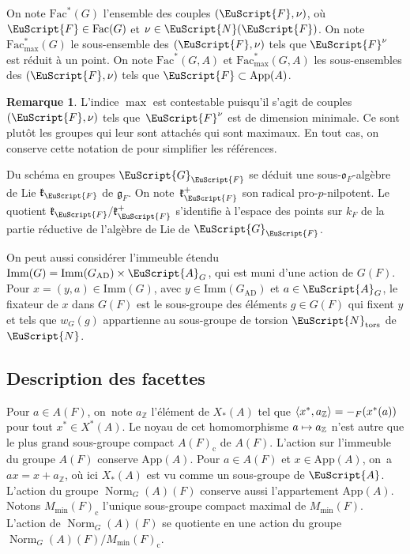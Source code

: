 \documentclass[JEP,XML,SOM,Unicode,francais]{cedram}
\let\mathcal \EuScript
\newcommand{\NoChangel}[1]{%
\expandafter\let\csname old\string#1\endcsname=#1
\let#1=\relax
\newcommand{#1}{\mathcode`l="716C\csname old\string#1\endcsname\mathcode`l="7160 }%
}
\let\<\langle
\let\>\rangle
\newcommand\mto{\mathchoice{\longmapsto}{\mapsto}{\mapsto}{\mapsto}}
\newcommand{\frg}{\mathfrak{g}}
\newcommand{\frk}{\mathfrak{k}}
\newcommand{\fro}{\mathfrak{o}}
\newcommand{\AD}{\mathrm{AD}}
\newcommand{\App}{\mathrm{App}}
\newcommand{\rc}{\mathrm{c}}
\newcommand{\Fac}{\mathrm{Fac}}
\newcommand{\Imm}{\mathrm{Imm}}
\newcommand{\tors}{\mathrm{tors}}
\DeclareMathOperator{\Norm}{Norm}
\DeclareMathOperator{\val}{val} \NoChangel{\val}
\newcommand{\cA}{\mathcal{A}}
\newcommand{\cF}{\mathcal{F}}
\newcommand{\cG}{\mathcal{G}}
\newcommand{\cN}{\mathcal{N}}
\newcommand{\ZZ}{\mathbb{Z}}
\theoremstyle{plain}
\theoremstyle{definition}
\newtheorem*{rem*}{Remarque}
\begin{document}
On note $\Fac^*(G)$ l'ensemble des couples $(\cF,\nu)$, où $\cF\in \Fac(G)$ et $\nu\in \cN(\cF)$. On note $\Fac^*_{\max}(G)$ le sous-ensemble des $(\cF,\nu)$ tels que $\cF^{\nu}$ est réduit à un point. On note $\Fac^*(G,A)$ et $\Fac^*_{\max}(G,A)$ les sous-ensembles des $(\cF,\nu)$ tels que $\cF\subset \App(A)$.

\begin{rem*}
L'indice $\max$ est contestable puisqu'il s'agit de couples $(\cF,\nu)$ tels que~$\cF^{\nu}$ est de dimension minimale. Ce sont plutôt les groupes qui leur sont attachés qui sont maximaux. En tout cas, on conserve cette notation de \cite{W2} pour simplifier les références.
\end{rem*}

Du schéma en groupes $\cG_{\cF}$ se déduit une sous-$\fro_{F}$-algèbre de Lie $\frk_{\cF}$ de $\frg_{F}$. On note~$\frk_{\cF}^+$ son radical pro-$p$-nilpotent. Le quotient $\frk_{\cF}/\frk_{\cF}^+$ s'identifie à l'espace des points sur $k_{F}$ de la partie réductive de l'algèbre de Lie de $\cG_{\cF}$.

On peut aussi considérer l'immeuble étendu $\Imm(G)=\Imm(G_{\AD})\times \cA_{G}$, qui est muni d'une action de $G(F)$. Pour $x=(y,a)\in \Imm(G)$, avec $y\in \Imm(G_{\AD})$ et $a\in \cA_{G}$, le fixateur de $x$ dans $G(F)$ est le sous-groupe des éléments $g\in G(F)$ qui fixent $y$ et tels que $w_{G}(g)$ appartienne au sous-groupe de torsion $\cN_{\tors}$ de $\cN$.

\subsection{Description des facettes}\label{description}

Pour $a\in A(F)$, on~note $a_{\ZZ}$ l'élément de $ X_{*}(A)$ tel que $\<x^*,a_{\ZZ}\>=-\val_{F}(x^*(a))$ pour tout $x^*\in X^*(A)$. Le noyau de cet homomorphisme $a\mto a_{\ZZ}$ n'est autre que le plus grand sous-groupe compact $A(F)_{\rc}$ de $A(F)$. L'action sur l'immeuble du groupe $A(F)$ conserve $\App(A)$. Pour $a\in A(F)$ et $x\in \App(A)$, on~a $ax= x+a_{\ZZ}$, où ici $X_{*}(A)$ est vu comme un sous-groupe de $\cA$. L'action du groupe $\Norm_{G}(A)(F)$ conserve aussi l'appartement $\App(A)$. Notons $M_{\min}(F)_{\rc}$ l'unique sous-groupe compact maximal de $M_{\min}(F)$. L'action de $\Norm_{G}(A)(F)$ se quotiente en une action du groupe $\Norm_{G}(A)(F)/M_{\min}(F)_{\rc}$.
\end{document}
